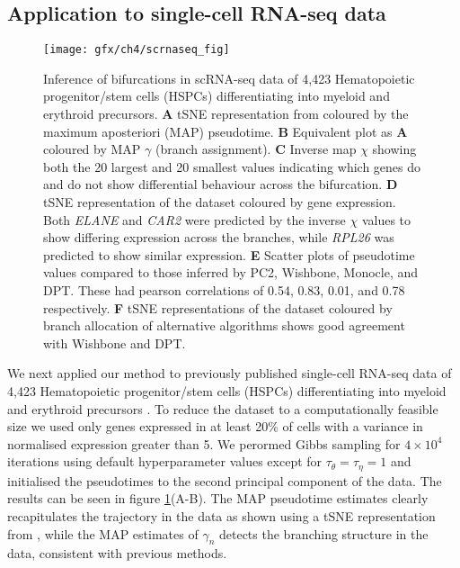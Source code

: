 \subsection{Application to single-cell RNA-seq data}

\begin{figure}
	\centering
	\texttt{[image: gfx/ch4/scrnaseq\_fig]}
	\caption{Inference of bifurcations in scRNA-seq data of 4,423 Hematopoietic progenitor/stem cells (HSPCs) differentiating into myeloid and erythroid precursors.
	{\normalfont
\textbf{A} tSNE representation from \cite{setty2016wishbone} coloured by the maximum aposteriori (MAP) pseudotime.
\textbf{B} Equivalent plot as \textbf{A} coloured by MAP $\gamma$ (branch assignment).
\textbf{C} Inverse map $\chi$ showing both the 20 largest and 20 smallest values indicating which genes do and do not show differential behaviour across the bifurcation.
\textbf{D} tSNE representation of the dataset coloured by gene expression. Both \emph{ELANE} and \emph{CAR2} were predicted by the inverse $\chi$ values to show differing expression across the branches, while \emph{RPL26} was predicted to show similar expression.
\textbf{E} Scatter plots of pseudotime values compared to those inferred by PC2, Wishbone, Monocle, and DPT. These had pearson correlations of 0.54, 0.83, 0.01, and 0.78 respectively.
\textbf{F} tSNE representations of the dataset coloured by branch allocation of alternative algorithms shows good agreement with Wishbone and DPT.
	}} \label{fig:scrnaseq}
\end{figure}


We next applied our method to previously published single-cell RNA-seq data of 4,423 Hematopoietic progenitor/stem cells (HSPCs) differentiating into myeloid and erythroid precursors \cite{paul2015transcriptional}.
To reduce the dataset to a computationally feasible size we used only genes expressed in at least 20\% of cells with a variance in normalised expression greater than 5.
We perormed Gibbs sampling for $4 \times 10^4$ iterations using default hyperparameter values except for $\tau_\theta = \tau_\eta = 1$ and initialised the pseudotimes to the second principal component of the data.
The results can be seen in figure \ref{fig:scrnaseq}(A-B). The MAP pseudotime estimates  clearly recapitulates the trajectory in the data as shown using a tSNE representation from \cite{setty2016wishbone}, while the MAP estimates of $\gamma_n$ detects the branching structure in the data, consistent with previous methods.


